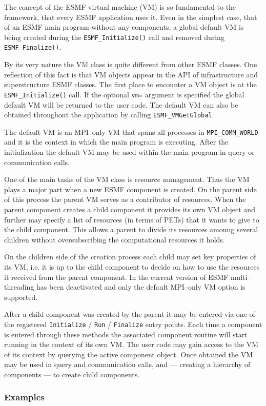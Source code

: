 
The concept of the ESMF virtual machine (VM) is so fundamental to the framework, that every ESMF application uses it. Even in the simplest case, that of an ESMF main program without any components, a global default VM is being created during the {\tt ESMF\_Initialize()} call and removed during {\tt ESMF\_Finalize()}.

By its very nature the VM class is quite different from other ESMF classes. One reflection of this fact is that VM objects appear in the API of infrastructure and superstructure ESMF classes. The first place to encounter a VM object is at the {\tt ESMF\_Initialize()} call. If the optional {\tt vm=} argument is specified the global default VM will be returned to the user code. The default VM can also be obtained throughout the application by calling {\tt ESMF\_VMGetGlobal}.

The default VM is an MPI--only VM that spans all processes in {\tt MPI\_COMM\_WORLD} and it is the context in which the main program is executing. After the initialization the default VM may be used within the main program in query or communication calls. 

One of the main tasks of the VM class is resource management. Thus the VM plays a major part when a new ESMF component is created. On the parent side of this process the parent VM serves as a contributor of resources. When the parent component creates a child component it provides its own VM object and further may specify a list of resources (in terms of PETs) that it wants to give to the child component. This allows a parent to divide its resources amoung several children without oversubscribing the computational resources it holds.

On the children side of the creation process each child may set key properties of its VM, i.e. it is up to the child component to decide on how to use the resources it received from the parent component. In the current version of ESMF multi--threading has been deactivated and only the default MPI--only VM option is supported.


After a child component was created by the parent it may be entered via one of the registered {\tt Initialize} / {\tt Run} / {\tt Finalize} entry points. Each time a component is entered through these methods the associated component routine will start running in the context of its own VM. The user code may gain access to the VM of its context by querying the active component object. Once obtained the VM may be used in query and communication calls, and --- creating a hierarchy of components --- to create child components.
 

\subsubsection{Examples}
